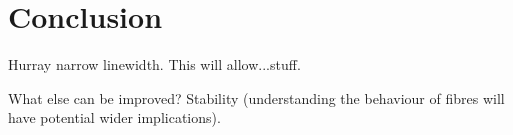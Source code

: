 \chapter{Conclusion}

Hurray narrow linewidth.
This will allow...stuff.

What else can be improved? Stability (understanding the behaviour of fibres will have potential wider implications).
